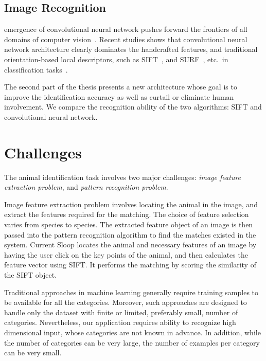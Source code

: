 \subsection{Image Recognition} %
emergence of convolutional neural network pushes forward the frontiers of all
domains of computer vision~\cite{lecun95}. Recent studies shows that
convolutional neural network architecture clearly dominates the handcrafted
features, and traditional orientation-based local descriptors, such as
SIFT~\cite{lowe04}, and SURF~\cite{surf08}, etc.\ in classification
tasks~\cite{fisher14,kriz12,prelu15,ILSVRC15}.

The second part of the thesis presents a new architecture whose goal is to
improve the identification accuracy as well as curtail or eliminate human
involvement. We compare the recognition ability of the two algorithms: SIFT and
convolutional neural network. 

\section{Challenges}

The animal identification task involves two major challenges: \emph{image
feature extraction problem}, and \emph{pattern recognition problem}. 

Image feature extraction problem involves locating the animal in the image, and
extract the features required for the matching. The choice of feature selection
varies from species to species. The extracted feature object of an image is
then passed into the pattern recognition algorithm to find the matches existed
in the system. Current Sloop locates the animal and necessary features of an
image by having the user click on the key points of the animal, and then
calculates the feature vector using SIFT\@. It performs the matching by scoring
the similarity of the SIFT object. 

Traditional approaches in machine learning generally require training samples to
be available for all the categories. Moreover, such approaches are designed to
handle only the dataset with finite or limited, preferably small, number of
categories. Nevertheless, our application requires ability to recognize high
dimensional input, whose categories are not known in advance. In addition, while
the number of categories can be very large, the number of examples per category
can be very small.
